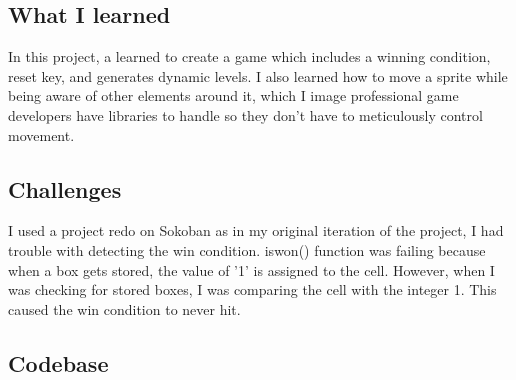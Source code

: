\subsection{What I learned}\label{sec:ps4:learned}

In this project, a learned to create a game which includes a winning condition, reset key, and generates dynamic levels. I also learned how to move a sprite while being aware of other elements around it, which I image professional game developers have libraries to handle so they don't have to meticulously control movement.

\subsection{Challenges}\label{sec:ps4:challenges}

I used a project redo on Sokoban as in my original iteration of the project, I had trouble with detecting the win condition. iswon() function was failing because when a box gets stored, the value of '1' is assigned to the cell. However, when I was checking for stored boxes, I was comparing the cell with the integer 1. This caused the win condition to never hit.

\subsection{Codebase}\label{sec:ps4:code}







\newpage
